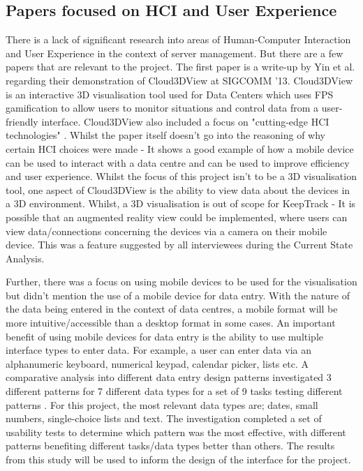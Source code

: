 \documentclass [11pt,a4paper]{article}
\begin{document}
\subsection{Papers focused on HCI and User Experience}
\label{sec:HCI}
There is a lack of significant research into areas of Human-Computer Interaction and User Experience in the context of server management. But there are a few papers that are relevant to the project. The first paper is a write-up by Yin et al. \cite{cloud3dview} regarding their demonstration of Cloud3DView at SIGCOMM '13. Cloud3DView is an interactive 3D visualisation tool used for Data Centers which uses FPS gamification to allow users to monitor situations and control data from a user-friendly interface. Cloud3DView also included a focus on "cutting-edge HCI technologies" \cite{cloud3dview}. Whilst the paper itself doesn't go into the reasoning of why certain HCI choices were made - It shows a good example of how a mobile device can be used to interact with a data centre and can be used to improve efficiency and user experience. Whilst the focus of this project isn't to be a 3D visualisation tool, one aspect of Cloud3DView is the ability to view data about the devices in a 3D environment. Whilst, a 3D visualisation is out of scope for KeepTrack - It is possible that an augmented reality view could be implemented, where users can view data/connections concerning the devices via a camera on their mobile device. This was a feature suggested by all interviewees during the Current State Analysis.

Further, there was a focus on using mobile devices to be used for the visualisation but didn't mention the use of a mobile device for data entry. With the nature of the data being entered in the context of data centres, a mobile format will be more intuitive/accessible than a desktop format in some cases. An important benefit of using mobile devices for data entry is the ability to use multiple interface types to enter data. For example, a user can enter data via an alphanumeric keyboard, numerical keypad, calendar picker, lists etc. A comparative analysis into different data entry design patterns investigated 3 different patterns for 7 different data types for a set of 9 tasks testing different patterns \cite{myka2019comparative}. For this project, the most relevant data types are; dates, small numbers, single-choice lists and text. The investigation completed a set of usability tests to determine which pattern was the most effective, with different patterns benefiting different tasks/data types better than others. The results from this study will be used to inform the design of the interface for the project.
\end{document}
